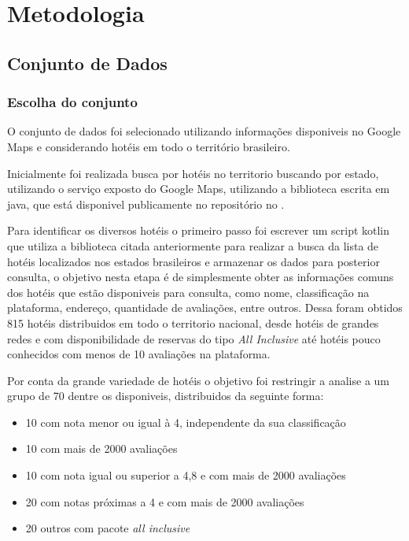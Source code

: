 \chapter{Metodologia}
\label{cap:metodologia}

\section{Conjunto de Dados}

\subsection{Escolha do conjunto}

O conjunto de dados foi selecionado utilizando informações disponiveis no Google Maps e considerando hotéis em todo o território brasileiro.

Inicialmente foi realizada busca por hotéis no territorio buscando por estado, utilizando o serviço exposto do Google Maps, utilizando a biblioteca escrita em java,  que está disponivel publicamente no repositório no .

Para identificar os diversos hotéis o primeiro passo foi escrever um script kotlin  que utiliza a biblioteca citada anteriormente para realizar a busca da lista de hotéis localizados nos estados brasileiros e armazenar os dados para posterior consulta, o objetivo nesta etapa é de simplesmente obter as informações comuns dos hotéis que estão disponiveis para consulta, como nome, classificação na plataforma, endereço, quantidade de avaliações, entre outros. Dessa foram obtidos 815 hotéis distribuidos em todo o territorio nacional, desde hotéis de grandes redes e com disponibilidade de reservas do tipo \emph{All Inclusive} até hotéis pouco conhecidos com menos de 10 avaliações na plataforma.


Por conta da grande variedade de hotéis o objetivo foi restringir a analise a um grupo de 70 dentre os disponiveis, distribuidos da seguinte forma:

\begin{itemize}
  \item 10 com nota menor ou igual à 4, independente da sua classificação
  \item 10 com mais de 2000 avaliações
  \item 10 com nota igual ou superior a 4,8 e com mais de 2000 avaliações
  \item 20 com notas próximas a 4 e com mais de 2000 avaliações
  \item 20 outros com pacote \emph{all inclusive}
\end{itemize}


